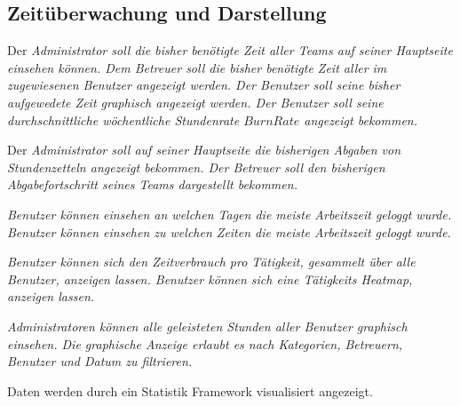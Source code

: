\subsection{Zeitüberwachung und Darstellung}
    \begin{requirements}
        \begin{requirements}
             Der \em{Administrator} soll die bisher benötigte Zeit aller \em{Teams} auf seiner \em{Hauptseite} einsehen können.
             Dem \em{Betreuer} soll die bisher benötigte Zeit aller im zugewiesenen \em{Benutzer} angezeigt werden.
             Der \em{Benutzer} soll seine bisher aufgewedete Zeit graphisch angezeigt werden.
             Der \em{Benutzer} soll seine durchschnittliche wöchentliche Stundenrate \(Burn Rate\) angezeigt bekommen.
        \end{requirements}

        \begin{requirements}
             Der \em{Administrator} soll auf seiner \em{Hauptseite} die bisherigen \em{Abgaben} von \em{Stundenzetteln} angezeigt bekommen.
             Der \em{Betreuer} soll den bisherigen Abgabefortschritt seines \em{Teams} dargestellt bekommen.
        \end{requirements}

        \begin{requirements}
             \em{Benutzer} können einsehen an welchen Tagen die meiste Arbeitszeit geloggt wurde.
             \em{Benutzer} können einsehen zu welchen Zeiten die meiste Arbeitszeit geloggt wurde.
        \end{requirements}

        \begin{requirements}
             \em{Benutzer} können sich den Zeitverbrauch pro Tätigkeit, gesammelt über alle \em{Benutzer}, anzeigen lassen.
             \em{Benutzer} können sich eine Tätigkeits \em{Heatmap}, anzeigen lassen.
        \end{requirements}
        
        \begin{requirements}
              \em{Administratoren} können alle geleisteten Stunden aller \em{Benutzer} graphisch einsehen.
              Die graphische Anzeige erlaubt es nach \em{Kategorien}, \em{Betreuern}, \em{Benutzer} und Datum zu filtrieren.
        \end{requirements}

        Daten werden durch ein Statistik Framework visualisiert angezeigt.
    \end{requirements}

